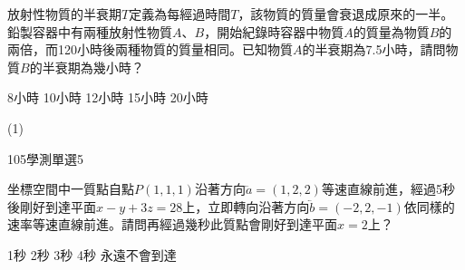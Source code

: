 \begin{QUESTIONS}
\begin{QUESTION}
\begin{ExamAnsRateInfo}{54}{91}{55}{16}
        \end{ExamAnsRateInfo}
        \begin{QBODY}
            放射性物質的半衰期$T$定義為每經過時間$T$，該物質的質量會衰退成原來的一半。鉛製容器中有兩種放射性物質$A$、$B$，開始紀錄時容器中物質$A$的質量為物質$B$的兩倍，而120小時後兩種物質的質量相同。已知物質$A$的半衰期為7.5小時，請問物質$B$的半衰期為幾小時？
			\begin{QOPS}
				\QOP 8小時	
				\QOP 10小時	
				\QOP 12小時	
				\QOP 15小時	
				\QOP 20小時
			\end{QOPS}
        \end{QBODY}
        \begin{QFROMS}
        \end{QFROMS}
        \begin{QTAGS}\end{QTAGS}
        \begin{QANS}
            (1)
        \end{QANS}
        \begin{QSOLLIST}
        \end{QSOLLIST}
        \begin{QEMPTYSPACE}
        \end{QEMPTYSPACE}
    \end{QUESTION}
    \begin{QUESTION}
        \begin{ExamInfo}{105}{學測}{單選}{5}
        \end{ExamInfo}
        \begin{ExamAnsRateInfo}{52}{86}{49}{21}
        \end{ExamAnsRateInfo}
        \begin{QBODY}
            坐標空間中一質點自點$P(1,1,1)$沿著方向$\lvec{a}=(1,2,2)$等速直線前進，經過5秒後剛好到達平面$x-y+3z=28$上，立即轉向沿著方向$\lvec{b}=(-2,2,-1)$依同樣的速率等速直線前進。請問再經過幾秒此質點會剛好到達平面$x=2$上？
			\begin{QOPS}
				\QOP 1秒
				\QOP 2秒
				\QOP 3秒
				\QOP 4秒
				\QOP 永遠不會到達
			\end{QOPS}
        \end{QBODY}
        \begin{QFROMS}
        \end{QFROMS}
        \begin{QTAGS}\end{QTAGS}

\end{QUESTION}
\end{QUESTIONS}
